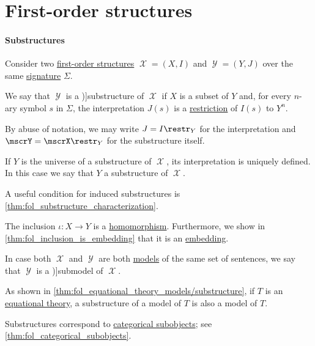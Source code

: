 \section{First-order structures}\label{sec:first_order_structures}

\paragraph{Substructures}

\begin{definition}\label{def:fol_substructure}
  Consider two \hyperref[def:fol_structure]{first-order structures} \( \mscrX = (X, I) \) and \( \mscrY = (Y, J) \) over the same \hyperref[def:fol_signature]{signature} \( \Sigma \).

  We say that \( \mscrY \) is a \term[ru=подструктура (\cite[114]{ШеньВерещагин2017ЯзыкиИИсчисления})]{substructure} of \( \mscrX \) if \( X \) is a subset of \( Y \) and, for every \( n \)-ary symbol \( s \) in \( \Sigma \), the interpretation \( J(s) \) is a \hyperref[def:set_valued_function/restriction]{restriction} of \( I(s) \) to \( Y^n \).

  By abuse of notation, we may write \( J = I\restr_Y \) for the interpretation and \( \mscrY = \mscrX\restr_Y \) for the substructure itself.

  \begin{thmenum}
    \mimprovised If \( Y \) is the universe of a substructure of \( \mscrX \), its interpretation is uniquely defined. In this case we say that \( Y \)  a substructure of \( \mscrX \).

    A useful condition for induced substructures is \cref{thm:fol_substructure_characterization}.

    \mimprovised The inclusion \( \iota: X \to Y \) is a \hyperref[def:fol_homomorphism]{homomorphism}. Furthermore, we show in \cref{thm:fol_inclusion_is_embedding} that it is an \hyperref[def:fol_embedding]{embedding}.

    \mimprovised In case both \( \mscrX \) and \( \mscrY \) are both \hyperref[def:fol_semantics/model]{models} of the same set of sentences, we say that \( \mscrY \) is a \term[ru=подмодель (\cite[53]{Мальцев1970АлгебраическиеСистемы})]{submodel} of \( \mscrX \).

    As shown in \cref{thm:fol_equational_theory_models/substructure}, if \( T \) is an \hyperref[def:fol_equational_theory]{equational theory}, a substructure of a model of \( T \) is also a model of \( T \).
  \end{thmenum}
\end{definition}
\begin{comments}
  \item Substructures correspond to \hyperref[def:categorical_subobject]{categorical subobjects}; see \cref{thm:fol_categorical_subobjects}.
\end{comments}

